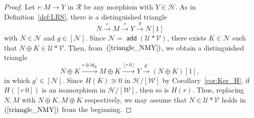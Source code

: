 \documentclass[a4paper,reqno,10pt]{amsart}
\theoremstyle{definition}
\theoremstyle{definition}
\theoremstyle{definition}
\theoremstyle{definition}
\theoremstyle{plain}
\def\add{\operatorname{\mathsf{add}}}
\newcommand{\id}{\mathsf{id}}
\newcommand{\CH}{\mathcal{H}}
\newcommand{\CN}{\mathcal{N}}
\newcommand{\CR}{\mathcal{R}}
\newcommand{\CU}{\mathcal{U}}
\newcommand{\CV}{\mathcal{V}}
\newcommand{\CW}{\mathcal{W}}
\begin{document}
\begin{proof}
Let $r\colon M\to Y$ in $\CR$ 
\color{blue}
be
\normalcolor
any morphism with $Y\in\CH$. 
\color{blue}
As in Definition~\ref{def:LRS}, there is a distinguished triangle
\begin{equation}\label{triangle_NMY}
N\xrightarrow{e}M\xrightarrow{r}Y\xrightarrow{g}N[1]
\end{equation}
with $N\in\CN$ and $g\in [\CN]$. 
Since $\CN=\add(\CU\ast\CV)$, there exists $K\in\CN$ such that $N\oplus K\in\CU\ast\CV$.
Then, from~$(\ref{triangle_NMY})$, we obtain a distinguished triangle
\[
N\oplus K\xrightarrow{e\oplus\id_K}M\oplus K\xrightarrow{[r\ 0]}Y\xrightarrow{g'} (N\oplus K)[1],
\]
in which $g'\in [\CN]$. Since $H(K)\cong 0$ in $\CH/[\CW]$ by Corollary~\ref{cor:Ker_H}, if $H([r\ 0])$ is an isomorphism in $\CH/[\CW]$, then so is $H(r)$. Thus, replacing $N,M$ with $N\oplus K,M\oplus K$ respectively, we may assume that $N\in\CU\ast\CV$ holds in $(\ref{triangle_NMY})$ from the beginning.


\end{proof}
\end{document}
